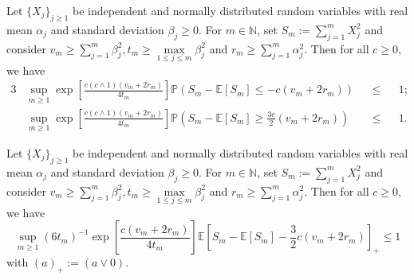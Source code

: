 \begin{lm}\label{lmA.1.1}
Let $\{X_{j}\}_{j \geq 1}$ be independent and normally distributed random variables with real mean $\alpha_{j}$ and standard deviation $\beta_{j} \geq 0$. For $m \in \mathds{N}$, set $S_{m} := \sum \limits_{j = 1}^{m} X_{j}^{2}$ and consider $v_{m} \geq \sum\limits_{j = 1}^{m} \beta_{j}^{2}, t_{m} \geq \max \limits_{1 \leq j \leq m} \beta_{j}^{2}$ and $r_{m} \geq \sum\limits_{j = 1}^{m} \alpha_{j}^{2}$.
Then for all $c \geq 0$, we have
\begin{alignat*}{3}
&\sup\limits_{m \geq 1} \exp\left[\frac{c (c \wedge 1) (v_{m} + 2 r_{m})}{4 t_{m}}\right]\mathds{P}\left(S_{m} - \mathds{E}[S_{m}] \leq - c (v_{m} + 2 r_{m})\right) &&\leq&& 1; \\
&\sup\limits_{m \geq 1} \exp\left[\frac{c (c \wedge 1) (v_{m} + 2 r_{m})}{4 t_{m}}\right]\mathds{P}\left(S_{m} - \mathds{E}[S_{m}] \geq \frac{3 c}{2} (v_{m} + 2 r_{m})\right) &&\leq&& 1.
\end{alignat*}
\end{lm}

\begin{lm}\label{lmA.1.2}
Let $\{X_{j}\}_{j \geq 1}$ be independent and normally distributed random variables with real mean $\alpha_{j}$ and standard deviation $\beta_{j} \geq 0$. For $m \in \mathds{N}$, set $S_{m} := \sum \limits_{j = 1}^{m} X_{j}^{2}$ and consider $v_{m} \geq \sum\limits_{j = 1}^{m} \beta_{j}^{2}, t_{m} \geq \max \limits_{1 \leq j \leq m} \beta_{j}^{2}$ and $r_{m} \geq \sum\limits_{j = 1}^{m} \alpha_{j}^{2}$.
Then for all $c \geq 0$, we have
\[\sup\limits_{m \geq 1}(6 t_{m})^{-1} \exp\left[\frac{c (v_{m} + 2 r_{m})}{4 t_{m}}\right] \mathds{E}\left[S_{m} - \mathds{E}[S_{m}] - \frac{3}{2} c (v_{m} + 2 r_{m})\right]_{+} \leq 1\]
with $(a)_{+} := (a \vee 0).$
\end{lm}